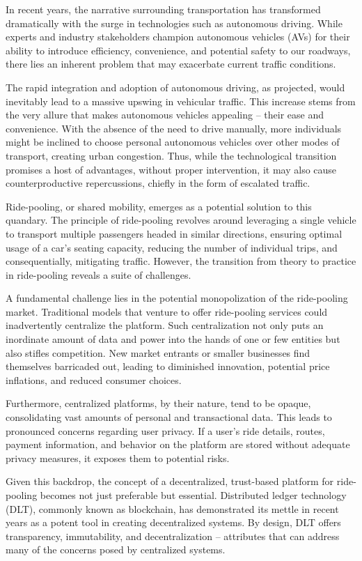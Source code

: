 In recent years, the narrative surrounding transportation has transformed dramatically with the surge in technologies such as autonomous driving. While experts and industry stakeholders champion autonomous vehicles (AVs) for their ability to introduce efficiency, convenience, and potential safety to our roadways, there lies an inherent problem that may exacerbate current traffic conditions.

The rapid integration and adoption of autonomous driving, as projected, would inevitably lead to a massive upswing in vehicular traffic. This increase stems from the very allure that makes autonomous vehicles appealing – their ease and convenience. With the absence of the need to drive manually, more individuals might be inclined to choose personal autonomous vehicles over other modes of transport, creating urban congestion. Thus, while the technological transition promises a host of advantages, without proper intervention, it may also cause counterproductive repercussions, chiefly in the form of escalated traffic.

Ride-pooling, or shared mobility, emerges as a potential solution to this quandary. The principle of ride-pooling revolves around leveraging a single vehicle to transport multiple passengers headed in similar directions, ensuring optimal usage of a car's seating capacity, reducing the number of individual trips, and consequentially, mitigating traffic. However, the transition from theory to practice in ride-pooling reveals a suite of challenges.

A fundamental challenge lies in the potential monopolization of the ride-pooling market. Traditional models that venture to offer ride-pooling services could inadvertently centralize the platform. Such centralization not only puts an inordinate amount of data and power into the hands of one or few entities but also stifles competition. New market entrants or smaller businesses find themselves barricaded out, leading to diminished innovation, potential price inflations, and reduced consumer choices.

Furthermore, centralized platforms, by their nature, tend to be opaque, consolidating vast amounts of personal and transactional data. This leads to pronounced concerns regarding user privacy. If a user’s ride details, routes, payment information, and behavior on the platform are stored without adequate privacy measures, it exposes them to potential risks.

Given this backdrop, the concept of a decentralized, trust-based platform for ride-pooling becomes not just preferable but essential. Distributed ledger technology (DLT), commonly known as blockchain, has demonstrated its mettle in recent years as a potent tool in creating decentralized systems. By design, DLT offers transparency, immutability, and decentralization – attributes that can address many of the concerns posed by centralized systems.

